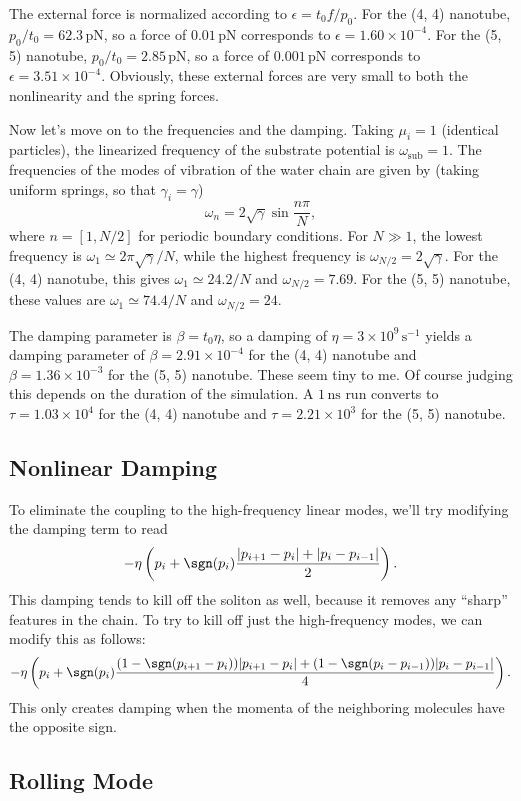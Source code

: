 \documentclass[11pt]{article}
\begin{document}
The external force is normalized according to $\epsilon=t_0 f/p_0$. For the (4, 4) nanotube, $p_0/t_0=62.3\,\text{pN}$, so a force of $0.01\,\text{pN}$ corresponds to $\epsilon=1.60\times10^{-4}$. For the (5, 5) nanotube, $p_0/t_0=2.85\,\text{pN}$, so a force of $0.001\,\text{pN}$ corresponds to $\epsilon=3.51\times10^{-4}$. Obviously, these external forces are very small to both the nonlinearity and the spring forces.

Now let's move on to the frequencies and the damping. Taking $\mu_i=1$ (identical particles), the linearized frequency of the substrate potential is $\omega_\text{sub}=1$. The frequencies of the modes of vibration of the water chain are given by (taking uniform springs, so that $\gamma_i=\gamma$)
\[
\omega_n=2\sqrt{\gamma}\sin\frac{n\pi}{N},
\]
where $n=[1,N/2]$ for periodic boundary conditions. For $N\gg1$, the lowest frequency is $\omega_1\simeq2\pi\sqrt{\gamma}/N$, while the highest frequency is $\omega_{N/2}=2\sqrt{\gamma}$. For the (4, 4) nanotube, this gives $\omega_1\simeq 24.2/N$ and $\omega_{N/2}=7.69$. For the (5, 5) nanotube, these values are $\omega_1\simeq 74.4/N$ and $\omega_{N/2}=24$.

The damping parameter is $\beta=t_0\eta$, so a damping of $\eta=3\times10^9\,\text{s}^{-1}$ yields a damping parameter of $\beta=2.91\times10^{-4}$ for the (4, 4) nanotube and $\beta=1.36\times10^{-3}$ for the (5, 5) nanotube. These seem tiny to me. Of course judging this depends on the duration of the simulation. A $1\,\text{ns}$ run converts to $\tau=1.03\times10^4$ for the (4, 4) nanotube and $\tau=2.21\times10^3$ for the (5, 5) nanotube.

\subsection{Nonlinear Damping}

To eliminate the coupling to the high-frequency linear modes, we'll try modifying the damping term to read
\[
-\eta \left(p_i+\sgn(p_i)\frac{|p_{i+1}-p_i|+|p_{i}-p_{i-1}|}{2}\right).
\]
This damping tends to kill off the soliton as well, because it removes any ``sharp'' features in the chain. To try to kill off just the high-frequency modes, we can modify this as follows:
\[
-\eta \left(p_i+\sgn(p_i)\frac{(1-\sgn(p_{i+1}-p_i))|p_{i+1}-p_i|+(1-\sgn(p_{i}-p_{i-1}))|p_{i}-p_{i-1}|}{4}\right).
\]
This only creates damping when the momenta of the neighboring molecules have the opposite sign.

\subsection{Rolling Mode}
\end{document}
